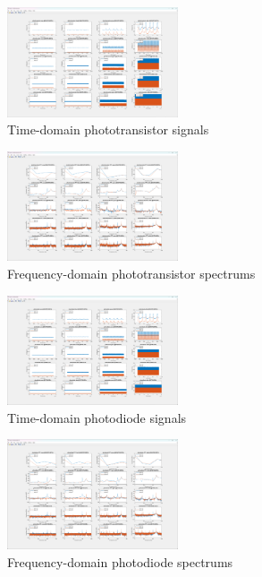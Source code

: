 \documentclass[conference]{IEEEtran}
\begin{document}
\begin{figure}[H]
	\centerline{\includegraphics[width=0.45\textwidth]{phototransistor-time.png}}
	\caption{Time-domain phototransistor signals}
	\label{fig:phototransistor-time}
\end{figure}
\begin{figure}[H]
	\centerline{\includegraphics[width=0.45\textwidth]{phototransistor-frequency.png}}
	\caption{Frequency-domain phototransistor spectrums}
	\label{fig:phototransistor-frequency}
\end{figure}
\begin{figure}[H]
	\centerline{\includegraphics[width=0.45\textwidth]{photodiode-time.png}}
	\caption{Time-domain photodiode signals}
	\label{fig:photodiode-time}
\end{figure}
\begin{figure}[H]
	\centerline{\includegraphics[width=0.45\textwidth]{photodiode-frequency.png}}
	\caption{Frequency-domain photodiode spectrums}
	\label{fig:photodiode-frequency}
\end{figure}
\end{document}
